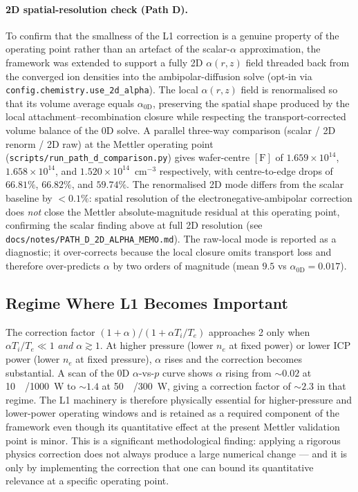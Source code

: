 \documentclass[11pt,a4paper]{report}
\begin{document}
\paragraph{2D spatial-resolution check (Path D).}  To confirm that the smallness of the L1 correction is a genuine property of the operating point rather than an artefact of the scalar-$\alpha$ approximation, the framework was extended to support a fully 2D $\alpha(r,z)$ field threaded back from the converged ion densities into the ambipolar-diffusion solve (opt-in via \texttt{config.chemistry.use\_2d\_alpha}).  The local $\alpha(r,z)$ field is renormalised so that its volume average equals $\alpha_{0\mathrm{D}}$, preserving the spatial shape produced by the local attachment--recombination closure while respecting the transport-corrected volume balance of the 0D solve.  A parallel three-way comparison (scalar / 2D renorm / 2D raw) at the Mettler operating point (\texttt{scripts/run\_path\_d\_comparison.py}) gives wafer-centre $[\mathrm{F}]$ of $1.659\times 10^{14}$, $1.658\times 10^{14}$, and $1.520\times 10^{14}$~cm$^{-3}$ respectively, with centre-to-edge drops of $66.81\%$, $66.82\%$, and $59.74\%$.  The renormalised 2D mode differs from the scalar baseline by $<0.1\%$: spatial resolution of the electronegative-ambipolar correction does \emph{not} close the Mettler absolute-magnitude residual at this operating point, confirming the scalar finding above at full 2D resolution (see \texttt{docs/notes/PATH\_D\_2D\_ALPHA\_MEMO.md}).  The raw-local mode is reported as a diagnostic; it over-corrects because the local closure omits transport loss and therefore over-predicts $\alpha$ by two orders of magnitude (mean $9.5$ vs $\alpha_{0\mathrm{D}} = 0.017$).

\subsection{Regime Where L1 Becomes Important}

The correction factor $(1+\alpha)/(1+\alpha T_i/T_e)$ approaches 2 only when $\alpha T_i/T_e \ll 1$ \emph{and} $\alpha \gtrsim 1$.  At higher pressure (lower $n_e$ at fixed power) or lower ICP power (lower $n_e$ at fixed pressure), $\alpha$ rises and the correction becomes substantial.  A scan of the 0D $\alpha$-vs-$p$ curve shows $\alpha$ rising from $\sim 0.02$ at \SI{10}{\milli\torr}/\SI{1000}{\watt} to $\sim 1.4$ at \SI{50}{\milli\torr}/\SI{300}{\watt}, giving a correction factor of $\sim 2.3$ in that regime.  The L1 machinery is therefore physically essential for higher-pressure and lower-power operating windows and is retained as a required component of the framework even though its quantitative effect at the present Mettler validation point is minor.  This is a significant methodological finding: applying a rigorous physics correction does not always produce a large numerical change --- and it is only by implementing the correction that one can bound its quantitative relevance at a specific operating point.
\end{document}
